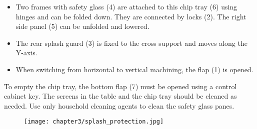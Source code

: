 \begin{itemize}
    \item Two frames with safety glass (4) are attached to this chip tray (6) using hinges and can be folded down. They are connected by locks (2). The right side panel (5) can be unfolded and lowered.
    \item The rear splash guard (3) is fixed to the cross support and moves along the Y-axis.
    \item When switching from horizontal to vertical machining, the flap (1) is opened.
\end{itemize}


To empty the chip tray, the bottom flap (7) must be opened using a control cabinet key. The screens in the table and the chip tray should be cleaned as needed. Use only household cleaning agents to clean the safety glass panes.

\vspace{.5cm}


\begin{figure}[h]
    \centering
    \texttt{[image: chapter3/splash\_protection.jpg]}
\end{figure}
